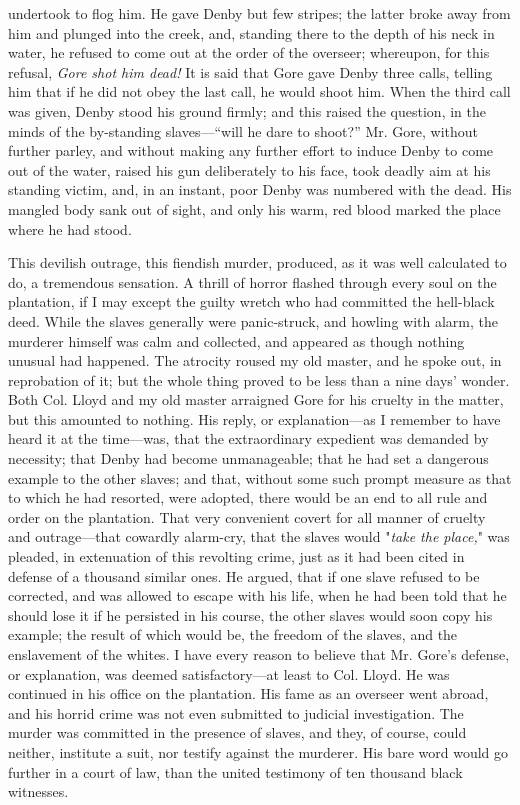 undertook to flog him. He gave Denby but few stripes; the latter broke
away from him and plunged into the creek, and, standing there to the
depth of his neck in water, he refused to come out at the order of the
overseer; whereupon, for this refusal, \emph{Gore shot him dead!} It is
said that Gore gave Denby three calls, telling him that if he did not
obey the last call, he would shoot him. When the third call was given,
Denby stood his ground firmly; and this raised the question, in the
minds of the by-standing slaves---``will he dare to shoot?'' Mr. Gore,
without further parley, and without making any further effort to induce
Denby to come out of the water, raised his gun deliberately to his face,
took deadly aim at his standing victim, and, in an instant, poor Denby
was numbered with the dead. His mangled body sank out of
{\protect\hypertarget{123}{}{}}sight, and only his warm, red blood
marked the place where he had stood.

This devilish outrage, this fiendish murder, produced, as it was well
calculated to do, a tremendous sensation. A thrill of horror flashed
through every soul on the plantation, if I may except the guilty wretch
who had committed the hell-black deed. While the slaves generally were
panic-struck, and howling with alarm, the murderer himself was calm and
collected, and appeared as though nothing unusual had happened. The
atrocity roused my old master, and he spoke out, in reprobation of it;
but the whole thing proved to be less than a nine days' wonder. Both
Col. Lloyd and my old master arraigned Gore for his cruelty in the
matter, but this amounted to nothing. His reply, or explanation---as I
remember to have heard it at the time---was, that the extraordinary
expedient was demanded by necessity; that Denby had become unmanageable;
that he had set a dangerous example to the other slaves; and that,
without some such prompt measure as that to which he had resorted, were
adopted, there would be an end to all rule and order on the plantation.
That very convenient covert for all manner of cruelty and outrage---that
cowardly alarm-cry, that the slaves would "\emph{take the place,}" was
pleaded, in extenuation of this revolting crime, just as it had been
cited in defense of a thousand similar ones. He argued, that if one
slave refused to be corrected, and was allowed to escape with his life,
when he had been told that he should lose it if he persisted in his
course, the other slaves would soon copy his example; the result of
which would be, the {\protect\hypertarget{124}{}{}}freedom of the
slaves, and the enslavement of the whites. I have every reason to
believe that Mr. Gore's defense, or explanation, was deemed
satisfactory---at least to Col. Lloyd. He was continued in his office on
the plantation. His fame as an overseer went abroad, and his horrid
crime was not even submitted to judicial investigation. The murder was
committed in the presence of slaves, and they, of course, could neither,
institute a suit, nor testify against the murderer. His bare word would
go further in a court of law, than the united testimony of ten thousand
black witnesses.

